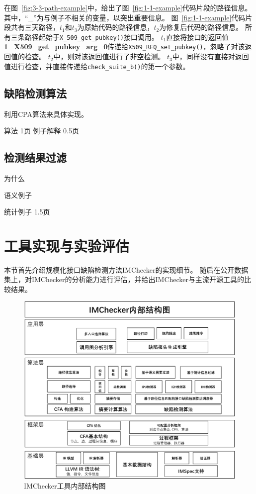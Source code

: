 在图~\ref{fig:3-3-path-example}中，给出了图~\ref{fig:1-1-example}代码片段的路径信息。
其中，“\_”为与例子不相关的变量，以突出重要信息。
图~\ref{fig:1-1-example}代码片段共有三天路径，$t_1$和$t_3$为原始代码的路径信息，$t_2$为修复后代码的路径信息。
所有三条路径起始于\texttt{X\_509\_get\_pubkey()}接口调用。
$t_1$直接将接口的返回值\textbf{1\_X509\_get\_pubkey\_arg\_0}传递给\texttt{X509\_REQ\_set\_pubkey()}，忽略了对该返回值的检查。
$t_2$中，则对该返回值进行了非空检测。
$t_3$中，同样没有直接对返回值进行检查，并直接传递给\texttt{check\_suite\_b()}的第一个参数。



\subsection{缺陷检测算法}

利用CPA算法来具体实现。

算法
1页
例子解释
0.5页



\subsection{检测结果过滤}
为什么

语义例子

统计例子
1.5页
\section{工具实现与实验评估}
\label{sec:3.4}
本节首先介绍规模化接口缺陷检测方法IMChecker的实现细节。
随后在公开数据集上，对IMChecker的分析能力进行评估，并给出IMChecker与主流开源工具的比较结果。

\begin{figure}[t]
	\centering
	\includegraphics[width=0.9\linewidth]{figures/cp3-implementation.png}
	\caption{
		IMChecker工具内部结构图
	}
	\label{fig:3-4-implementation}
\end{figure}

